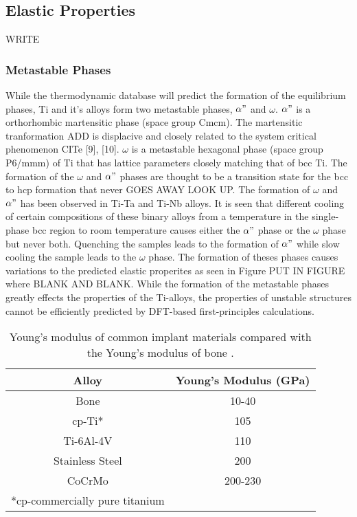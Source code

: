\subsection{Elastic Properties}

WRITE

\subsubsection{Metastable Phases}

While the thermodynamic database will predict the formation of the equilibrium phases, Ti and it's alloys form two metastable phases, $\alpha"$ and $\omega$. $\alpha"$ is a orthorhombic martensitic phase (space group Cmcm). The martensitic tranformation ADD is displacive and closely related to the system critical phenomenon CITe [9], [10]. $\omega$ is a metastable hexagonal phase (space group P6/mmm) of Ti that has lattice parameters closely matching that of bcc Ti. The formation of the $\omega$ and $\alpha"$ phases are thought to be a transition state for the bcc to hcp formation that never GOES AWAY LOOK UP. The formation of $\omega$ and $\alpha"$ has been observed in Ti-Ta and Ti-Nb alloys. It is seen that different cooling of certain compositions of these binary alloys from a temperature in the single-phase bcc region to room temperature causes either the $\alpha"$ phase or the $\omega$ phase but never both. Quenching the samples leads to the formation of $\alpha"$ while slow cooling the sample leads to the $\omega$ phase. The formation of theses phases causes variations to the predicted elastic properites as seen in Figure PUT IN FIGURE where BLANK AND BLANK. While the formation of the metastable phases greatly effects the properties of the Ti-alloys, the properties of unstable structures cannot be efficiently predicted by DFT-based first-principles calculations.



\pagebreak
\begin{table}
	\caption{Young's modulus of common implant materials compared with the Young's modulus of bone \cite{Long1998a}.}
	\centering
	\begin{tabular}{ c c }
		\hline
		Alloy & Young's Modulus (GPa) \\
		\hline
		Bone & 10-40\\
		cp-Ti* & 105\\
		Ti-6Al-4V & 110\\
		Stainless Steel & 200\\
		CoCrMo & 200-230\\
		\hline
		*cp-commercially pure titanium 
	\end{tabular}
\label{table:commonEM}
\end{table}
